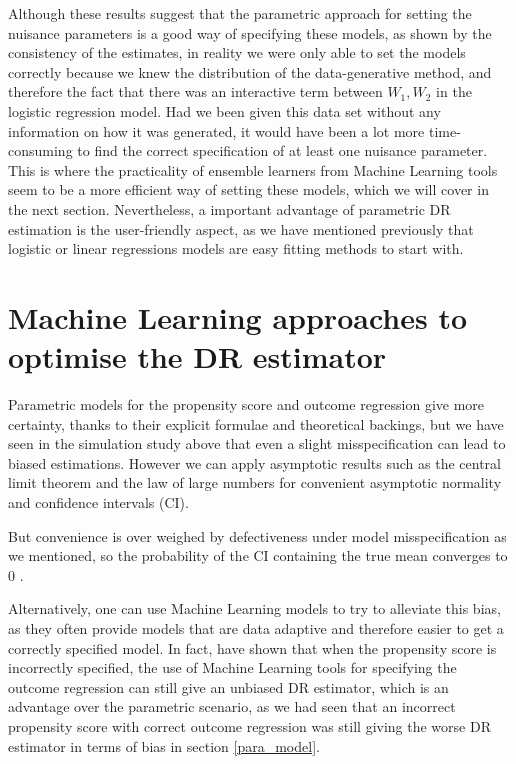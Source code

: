 \documentclass[12pt,twoside]{article}
\begin{document}
Although these results suggest that the parametric approach for setting the nuisance parameters is a good way of specifying these models, as shown by the consistency of the estimates, in reality we were only able to set the models correctly because we knew the distribution of the data-generative method, and therefore the fact that there was an interactive term between $W_1,W_2$ in the logistic regression model. Had we been given this data set without any information on how it was generated, it would have been a lot more time-consuming to find the correct specification of at least one nuisance parameter. This is where the practicality of ensemble learners from Machine Learning tools seem to be a more efficient way of setting these models, which we will cover in the next section. Nevertheless, a important advantage of parametric DR estimation is the user-friendly aspect, as we have mentioned previously that logistic or linear regressions models are easy fitting methods to start with.

\clearpage
\section{Machine Learning approaches to optimise the DR estimator}

Parametric models for the propensity score and outcome regression give more certainty, thanks to their explicit formulae and theoretical backings, but we have seen in the simulation study above that even a slight misspecification can lead to biased estimations. However we can apply asymptotic results such as the central limit theorem and the law of large numbers for convenient asymptotic normality and confidence intervals (CI).

But convenience is over weighed by defectiveness under model misspecification as we mentioned, so the probability of the CI containing the true mean converges to 0 \citep{diaz}.

Alternatively, one can use Machine Learning models to try to alleviate this bias, as they often provide models that are data adaptive and therefore easier to get a correctly specified model. In fact, \citet{ps_SL} have shown that when the propensity score is incorrectly specified, the use of Machine Learning tools for specifying the outcome regression can still give an unbiased DR estimator, which is an advantage over the parametric scenario, as we had seen that an incorrect propensity score with correct outcome regression was still giving the worse DR estimator in terms of bias in section \ref{para_model}.
\end{document}
